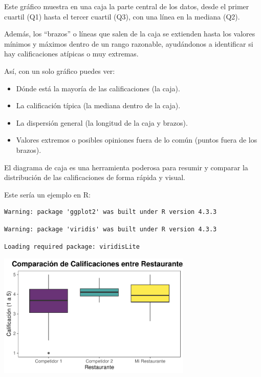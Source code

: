\documentclass[
  spanish,
  letterpaper,
  DIV=11,
  numbers=noendperiod]{scrreprt}
\providecommand{\tightlist}{%
  \setlength{\itemsep}{0pt}\setlength{\parskip}{0pt}}
\begin{document}
Este gráfico muestra en una caja la parte central de los datos, desde el
primer cuartil (Q1) hasta el tercer cuartil (Q3), con una línea en la
mediana (Q2).

Además, los ``brazos'' o líneas que salen de la caja se extienden hasta
los valores mínimos y máximos dentro de un rango razonable, ayudándonos
a identificar si hay calificaciones atípicas o muy extremas.

Así, con un solo gráfico puedes ver:

\begin{itemize}
\tightlist
\item
  Dónde está la mayoría de las calificaciones (la caja).\\
\item
  La calificación típica (la mediana dentro de la caja).\\
\item
  La dispersión general (la longitud de la caja y brazos).\\
\item
  Valores extremos o posibles opiniones fuera de lo común (puntos fuera
  de los brazos).
\end{itemize}

El diagrama de caja es una herramienta poderosa para resumir y comparar
la distribución de las calificaciones de forma rápida y visual.

Este sería un ejemplo en R:

\begin{verbatim}
Warning: package 'ggplot2' was built under R version 4.3.3
\end{verbatim}

\begin{verbatim}
Warning: package 'viridis' was built under R version 4.3.3
\end{verbatim}

\begin{verbatim}
Loading required package: viridisLite
\end{verbatim}

\begin{center}
\includegraphics[width=3.64583in,height=\textheight,keepaspectratio]{capitulo3_files/figure-pdf/unnamed-chunk-12-1.pdf}
\end{center}
\end{document}
